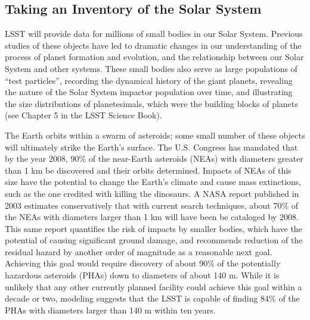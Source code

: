 \subsection{Taking an Inventory of the Solar System}

LSST will provide data for millions of small bodies in our Solar System. Previous studies
of these objects have led to dramatic changes in our understanding of the process of
planet formation and evolution, and the relationship between our Solar System and other
systems. These small bodies also serve as large populations of ``test particles'', recording
the dynamical history of the giant planets, revealing the nature of the Solar System impactor
population over time, and illustrating the size distributions of planetesimals, which were the
building blocks of planets  (see Chapter 5 in the LSST Science Book).

The Earth orbits within a swarm of asteroids; some small number of these
objects will ultimately strike the Earth's surface. The U.S. Congress has
mandated that by the year 2008, 90\% of the near-Earth asteroids (NEAs)
with diameters greater than 1 km be discovered and their orbits
determined. Impacts of NEAs of this size have the potential to change the
Earth's climate and cause mass extinctions, such as the one credited with
killing the dinosaurs. A NASA report published in 2003 estimates
conservatively that with current search techniques, about 70\% of the NEAs
with diameters larger than 1 km will have been be cataloged by 2008. This same report
quantifies the risk of impacts by smaller bodies, which have the potential
of causing significant ground damage, and recommends reduction of the residual
hazard by another order of magnitude  as a reasonable next
goal. Achieving this goal would require discovery of about 90\% of the
potentially hazardous asteroids (PHAs) down to diameters of about 140
m. While it is unlikely that any other currently planned facility could achieve
this goal within a decade or two, modeling suggests that the LSST is capable
of finding 84\% of the PHAs with diameters larger than 140 m within
ten years.

